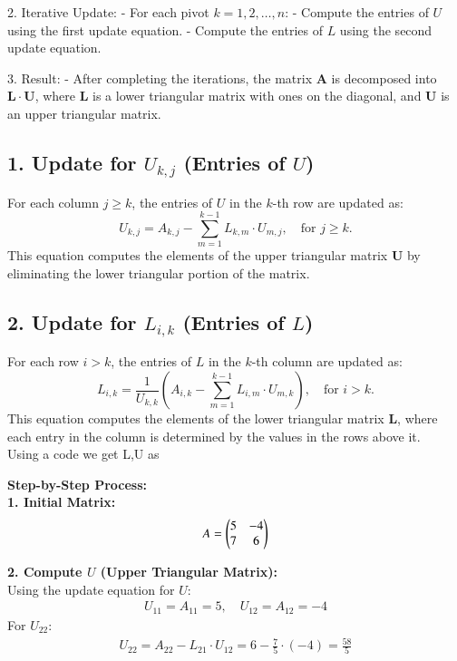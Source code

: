 \documentclass[journal]{IEEEtran}
\begin{document}
2. Iterative Update:
   - For each pivot $ k = 1, 2, \ldots, n $:
     - Compute the entries of $ U $ using the first update equation.
     - Compute the entries of $ L $ using the second update equation.
   
3. Result:
   - After completing the iterations, the matrix $ \mathbf{A} $ is decomposed into $ \mathbf{L} \cdot \mathbf{U} $, where $ \mathbf{L} $ is a lower triangular matrix with ones on the diagonal, and $ \mathbf{U} $ is an upper triangular matrix.
\subsection*{1. Update for $ U_{k,j} $ (Entries of $ U $)}

For each column $ j \geq k $, the entries of $ U $ in the $ k $-th row are updated as:
\[
U_{k,j} = A_{k,j} - \sum_{m=1}^{k-1} L_{k,m} \cdot U_{m,j}, \quad \text{for } j \geq k.
\]
This equation computes the elements of the upper triangular matrix $ \mathbf{U} $ by eliminating the lower triangular portion of the matrix.

\subsection*{2. Update for $ L_{i,k} $ (Entries of $ L $)}

For each row $ i > k $, the entries of $ L $ in the $ k $-th column are updated as:
\[
L_{i,k} = \frac{1}{U_{k,k}} \left( A_{i,k} - \sum_{m=1}^{k-1} L_{i,m} \cdot U_{m,k} \right), \quad \text{for } i > k.
\]
This equation computes the elements of the lower triangular matrix $ \mathbf{L} $, where each entry in the column is determined by the values in the rows above it.\\
Using a code we get L,U as 

\textbf{Step-by-Step Process:}\\

\textbf{1. Initial Matrix:}
\begin{align}
    A = \begin{pmatrix}5 & -4 \\ 7 & 6\end{pmatrix}
\end{align}

\textbf{2. Compute $U$ (Upper Triangular Matrix):}\\
Using the update equation for $U$:
\begin{align}
    U_{11} = A_{11} = 5, \quad U_{12} = A_{12} = -4
\end{align}
For $U_{22}$:
\begin{align}
    U_{22} = A_{22} - L_{21} \cdot U_{12} = 6 - \frac{7}{5} \cdot (-4) = \frac{58}{5}
\end{align}
\end{document}
